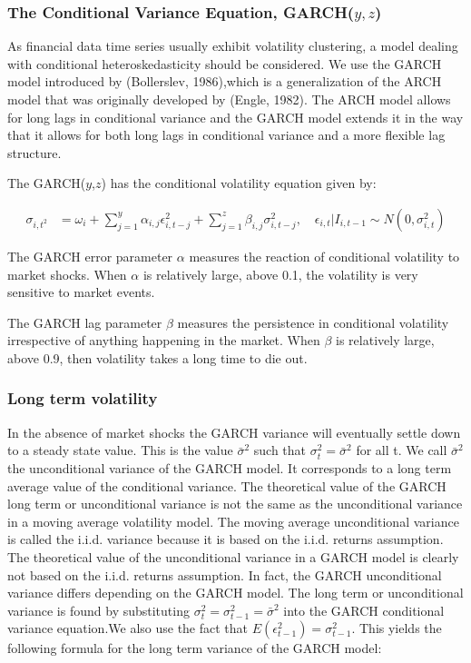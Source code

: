 \subsubsection{The Conditional Variance Equation, GARCH($y,z$)}
As financial data time series usually exhibit volatility clustering, a model dealing with
conditional heteroskedasticity should be considered. We use the GARCH model introduced by (Bollerslev, 1986),which is a generalization of the ARCH model that was originally developed by (Engle, 1982). The ARCH model allows for long lags in conditional variance and the GARCH model extends it in the way that it allows for both long lags in conditional variance and a more flexible lag structure.

The GARCH($y$,$z$) has the conditional volatility equation given by:

\begin{align}
    \sigma_{i,t^2} &= \omega_i + \sum_{j=1}^y\alpha_{i,j}\epsilon_{i,t-j}^2+\sum_{j=1}^z\beta_{i,j}\sigma_{i,t-j}^2,\quad\epsilon_{i,t} | I_{i,t-1} \sim N(0,{\sigma_{i,t}^2}) \label{ConditionalVolatilityEquation}
\end{align}

The GARCH error parameter $\alpha$ measures the reaction of conditional volatility to market shocks. When $\alpha$ is relatively large, above 0.1, the volatility is very sensitive to market events.

The GARCH lag parameter $\beta$ measures the persistence in conditional volatility irrespective of anything happening in the market. When $\beta$ is relatively large, above 0.9, then volatility takes a long time to die out.

\subsubsection{Long term volatility}

In the absence of market shocks the GARCH variance will eventually settle down to a steady state value. This is the value $\bar{\sigma}^2$ such that ${\sigma_t^2} = \bar{\sigma}^2$ for all t. We call $\bar{\sigma}^2$ the unconditional variance of the GARCH model. It corresponds to a long term average value of the conditional variance. The theoretical value of the GARCH long term or unconditional variance is not the same as the unconditional variance in a moving average volatility model. The moving average unconditional variance is called the i.i.d. variance because it is based on the i.i.d. returns assumption. The theoretical value of the unconditional variance in a GARCH model is clearly not based on the i.i.d. returns assumption. In fact, the GARCH unconditional variance differs depending on the GARCH model. The long term or unconditional variance is found by substituting ${\sigma_t^2} = {\sigma_{t-1}^2} = \bar{\sigma}^2$ into the GARCH conditional variance equation.We also use the fact that $E(\epsilon_{t-1}^2)=\sigma_{t-1}^2$. This yields the following formula for the long term variance of the GARCH model:

